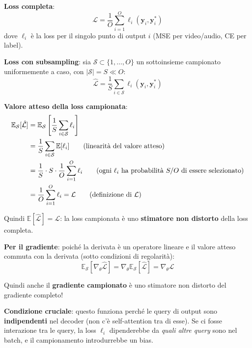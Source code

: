 \documentclass[12pt,a4paper]{article}
\begin{document}
\begin{proofbox}
\textbf{Loss completa}:
\[
\mathcal{L} = \frac{1}{O}\sum_{i=1}^{O} \ell_i(\mathbf{y}_i, \mathbf{y}_i^*)
\]
dove $\ell_i$ \`e la loss per il singolo punto di output $i$ (MSE per video/audio, CE per label).

\textbf{Loss con subsampling}: sia $\mathcal{S} \subset \{1, \ldots, O\}$ un sottoinsieme campionato uniformemente a caso, con $|\mathcal{S}| = S \ll O$:
\[
\hat{\mathcal{L}} = \frac{1}{S}\sum_{i \in \mathcal{S}} \ell_i(\mathbf{y}_i, \mathbf{y}_i^*)
\]

\textbf{Valore atteso della loss campionata}:
\begin{align}
\mathbb{E}_{\mathcal{S}}[\hat{\mathcal{L}}] &= \mathbb{E}_{\mathcal{S}}\left[\frac{1}{S}\sum_{i \in \mathcal{S}} \ell_i\right] \\
&= \frac{1}{S} \sum_{i \in \mathcal{S}} \mathbb{E}[\ell_i] \tag{linearit\`a del valore atteso} \\
&= \frac{1}{S} \cdot S \cdot \frac{1}{O}\sum_{i=1}^{O} \ell_i \tag{ogni $\ell_i$ ha probabilit\`a $S/O$ di essere selezionato} \\
&= \frac{1}{O}\sum_{i=1}^{O} \ell_i = \mathcal{L} \tag{definizione di $\mathcal{L}$}
\end{align}

Quindi $\mathbb{E}[\hat{\mathcal{L}}] = \mathcal{L}$: la loss campionata \`e uno \textbf{stimatore non distorto} della loss completa.

\textbf{Per il gradiente}: poich\'e la derivata \`e un operatore lineare e il valore atteso commuta con la derivata (sotto condizioni di regolarit\`a):
\[
\mathbb{E}_{\mathcal{S}}\left[\nabla_\theta \hat{\mathcal{L}}\right] = \nabla_\theta \mathbb{E}_{\mathcal{S}}[\hat{\mathcal{L}}] = \nabla_\theta \mathcal{L}
\]

Quindi anche il \textbf{gradiente campionato} \`e uno stimatore non distorto del gradiente completo!

\textbf{Condizione cruciale}: questo funziona perch\'e le query di output sono \textbf{indipendenti} nel decoder (non c'\`e self-attention tra di esse). Se ci fosse interazione tra le query, la loss $\ell_i$ dipenderebbe da \emph{quali altre query} sono nel batch, e il campionamento introdurrebbe un bias.
\end{proofbox}
\end{document}
